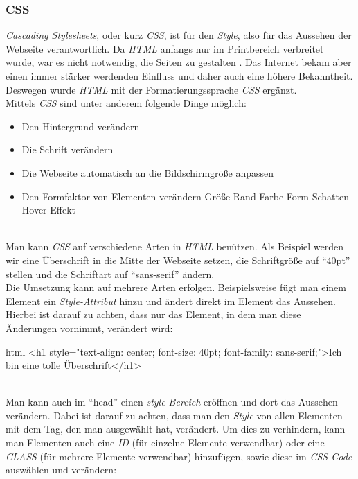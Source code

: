 		\subsubsection{CSS}
		\label{chapter:study-frontend-css}
		\textit{Cascading Stylesheets}, oder kurz \textit{CSS}, ist für den \textit{Style}, also für das Aussehen der Webseite verantwortlich. Da \textit{HTML} anfangs nur im Printbereich verbreitet wurde, war es nicht notwendig, die Seiten zu gestalten \cite{html5-css3-def, html5-css3-handbuch}. Das Internet bekam aber einen immer stärker werdenden Einfluss und daher auch eine höhere Bekanntheit. Deswegen wurde \textit{HTML} mit der Formatierungssprache \textit{CSS} ergänzt.\\
		Mittels \textit{CSS} sind unter anderem folgende Dinge möglich:
		\begin{itemize}
			\item Den Hintergrund verändern
			\item Die Schrift verändern
			\item Die Webseite automatisch an die Bildschirmgröße anpassen
			\item Den Formfaktor von Elementen verändern
			\subitem Größe
			\subitem Rand
			\subitem Farbe
			\subitem Form
			\subitem Schatten
			\subitem Hover-Effekt
		\end{itemize}
	\label{list:bspcss}~\\
		Man kann \textit{CSS} auf verschiedene Arten in \textit{HTML} benützen. Als Beispiel werden wir eine Überschrift in die Mitte der Webseite setzen, die Schriftgröße auf \enquote{40pt} stellen und die Schriftart auf \enquote{sans-serif} ändern.\\
		Die Umsetzung kann auf mehrere Arten erfolgen. Beispielsweise fügt man einem Element ein \textit{Style-Attribut} hinzu und ändert direkt im Element das Aussehen. Hierbei ist darauf zu achten, dass nur das Element, in dem man diese Änderungen vornimmt, verändert wird:
		\begin{code}{html}
			<h1 style="text-align: center; font-size: 40pt; font-family: sans-serif;">Ich bin eine tolle Überschrift</h1>
		\end{code}
	\label{list:bspinlinecss}~\\
		Man kann auch im \enquote{head} einen \textit{style-Bereich} eröffnen und dort das Aussehen verändern. Dabei ist darauf zu achten, dass man den \textit{Style} von allen Elementen mit dem Tag, den man ausgewählt hat, verändert. Um dies zu verhindern, kann man Elementen auch eine \textit{ID} (für einzelne Elemente verwendbar) oder eine \textit{CLASS} (für mehrere Elemente verwendbar) hinzufügen, sowie diese im \textit{CSS-Code} auswählen und verändern:
